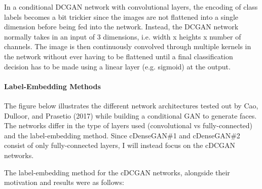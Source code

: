 \documentclass[11pt]{article}
\begin{document}
In a conditional DCGAN network with convolutional layers, the encoding
of class labels becomes a bit trickier since the images are not
flattened into a single dimension before being fed into the network.
Instead, the DCGAN network normally takes in an input of 3 dimensions,
i.e. width x heights x number of channels. The image is then
continuously convolved through multiple kernels in the network without
ever having to be flattened until a final classification decision has to
be made using a linear layer (e.g. sigmoid) at the output.

\paragraph{Label-Embedding Methods}\label{label-embedding-methods}

The figure below illustrates the different network architectures tested
out by Cao, Dulloor, and Prasetio (2017) while building a conditional
GAN to generate faces. The networks differ in the type of layers used
(convolutional vs fully-connected) and the label-embedding method. Since
cDenseGAN\#1 and cDenseGAN\#2 consist of only fully-connected layers, I
will instead focus on the cDCGAN networks.\\

    \begin{center}
    \end{center}

The label-embedding method for the cDCGAN networks, alongside their
motivation and results were as follows:
\end{document}
